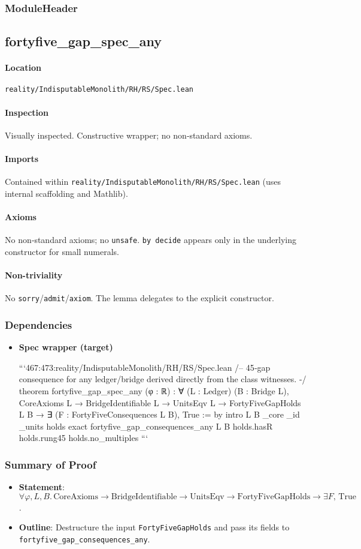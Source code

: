 \documentclass{article}
\newcommand{\FileRef}[1]{\texttt{#1}}
\newcommand{\ModuleHeader}[3]{%
  \subsection{#1}
  \paragraph{Location} \FileRef{#2}\\
  \paragraph{Inspection} #3
}
\begin{document}
\subsubsection{ModuleHeader}
\ModuleHeader{fortyfive\_gap\_spec\_any}{reality/IndisputableMonolith/RH/RS/Spec.lean}{Visually inspected. Constructive wrapper; no non‑standard axioms.}

\paragraph{Imports}
Contained within \FileRef{reality/IndisputableMonolith/RH/RS/Spec.lean} (uses internal scaffolding and Mathlib).

\paragraph{Axioms}
No non‑standard axioms; no \texttt{unsafe}. \texttt{by decide} appears only in the underlying constructor for small numerals.

\paragraph{Non-triviality}
No \texttt{sorry}/\texttt{admit}/\texttt{axiom}. The lemma delegates to the explicit constructor.

\subsubsection{Dependencies}
\begin{itemize}[leftmargin=*]
  \item \textbf{Spec wrapper (target)}

```467:473:reality/IndisputableMonolith/RH/RS/Spec.lean
/-- 45‑gap consequence for any ledger/bridge derived directly from the class witnesses. -/
 theorem fortyfive_gap_spec_any (φ : ℝ) :
  ∀ (L : Ledger) (B : Bridge L),
    CoreAxioms L → BridgeIdentifiable L → UnitsEqv L → FortyFiveGapHolds L B →
      ∃ (F : FortyFiveConsequences L B), True := by
  intro L B _core _id _units holds
  exact fortyfive_gap_consequences_any L B holds.hasR holds.rung45 holds.no_multiples
```
\end{itemize}

\subsubsection{Summary of Proof}
\begin{itemize}[leftmargin=*]
  \item \textbf{Statement}: \(\forall φ,L,B.\, \mathrm{CoreAxioms}\to\mathrm{BridgeIdentifiable}\to\mathrm{UnitsEqv}\to\mathrm{FortyFiveGapHolds}\to\exists F,\,\mathrm{True}\).
  \item \textbf{Outline}: Destructure the input \texttt{FortyFiveGapHolds} and pass its fields to \texttt{fortyfive\_gap\_consequences\_any}.
\end{itemize}
\end{document}
